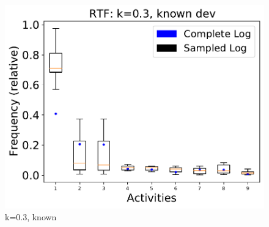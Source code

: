 \documentclass[landscape]{article}
\begin{document}
\begin{figure}[!htb]
\begin{minipage}{0.2\textwidth}
	\end{minipage}
	\hfill
	\begin{minipage}{0.2\textwidth}
		\includegraphics[width=1.0\textwidth]{../Road_Traffic_Fines_Management_Process/Road_Traffic_Fines_Management_Process_deviationsApprox_0.3_NONALIGNING_KNOWN.pdf}
		\caption{k=0.3, known}
	\end{minipage}
\end{figure}
\end{document}
